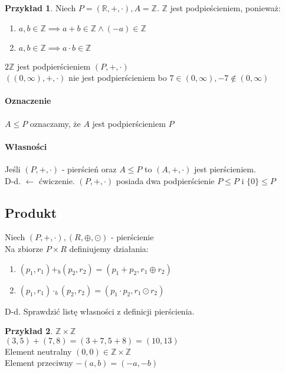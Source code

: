 \documentclass{article}
\theoremstyle{definition}
\theoremstyle{definition}
\theoremstyle{definition}
\newtheorem{pk}{Przykład}[subsection]
\theoremstyle{definition}
\begin{document}
\begin{pk}
Niech $P=(\mathbb{R}, +, \cdot), A=\mathbb{Z}$. $\mathbb{Z}$ jest podpieścieniem, ponieważ:
\begin{enumerate}
\item $a,b \in \mathbb{Z} \implies a+b\in \mathbb{Z} \land (-a)\in \mathbb{Z}$
\item $a,b \in \mathbb{Z} \implies a\cdot b\in \mathbb{Z}$
\end{enumerate}
$2\mathbb{Z}$ jest podpierścieniem $(P,+,\cdot)$\\
$((0,\infty),+,\cdot)$ nie jest podpierścieniem bo $7\in (0,\infty), -7\notin (0,\infty)$
\end{pk}

\paragraph{Oznaczenie}
$A\leq P$ oznaczamy, że $A$ jest podpierścieniem $P$

\paragraph{Własności} Jeśli $(P,+,\cdot)$ - pierścień oraz $A\leq P$
to $(A,+,\cdot)$ jest pierścieniem.\\

D-d. $\leftarrow$ ćwiczenie.
$(P,+,\cdot)$ posiada dwa podpierścienie $P\leq P$ i $\{0\}\leq P$

\subsection{Produkt}
Niech $(P,+,\cdot), (R,\oplus,\odot)$ - pierścienie\\
Na zbiorze $P\times R$ definiujemy działania:
\begin{enumerate}
\item $(p_1, r_1) +_b (p_2, r_2) = (p_1+p_2,r_1 \oplus r_2)$ 
\item $(p_1, r_1) \cdot_b (p_2,r_2) = (p_1\cdot p_2, r_1\odot r_2)$
\end{enumerate}
D-d. Sprawdzić listę własności z definicji pierścienia.

\begin{pk}
$\mathbb{Z}\times \mathbb{Z}$\\
$(3,5) + (7,8) = (3+7, 5+8) = (10,13)$\\
Element neutralny $(0,0)\in \mathbb{Z}\times \mathbb{Z}$\\
Element przeciwny $-(a,b) = (-a,-b)$
\end{pk}
\end{document}
